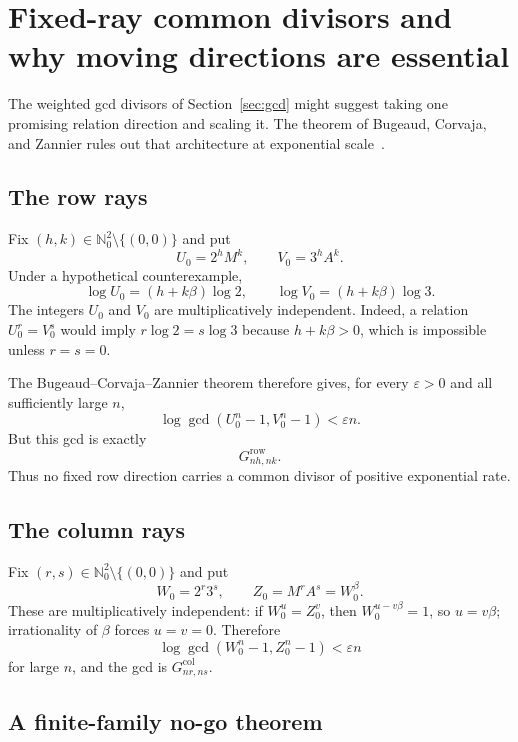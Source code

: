 \documentclass[11pt]{article}
\theoremstyle{definition}
\theoremstyle{remark}
\newcommand{\Nzero}{\mathbb N_0}
\begin{document}
\section{Fixed-ray common divisors and why moving directions are essential}
\label{sec:fixed-rays}

The weighted gcd divisors of Section~\ref{sec:gcd} might suggest taking one promising relation direction and scaling it.  The theorem of Bugeaud, Corvaja, and Zannier rules out that architecture at exponential scale~\cite{BCZ2003}.

\subsection{The row rays}

Fix $(h,k)\in\Nzero^2\setminus\{(0,0)\}$ and put
\[
 U_0=2^hM^k,
 \qquad V_0=3^hA^k.
\]
Under a hypothetical counterexample,
\[
 \log U_0=(h+k\beta)\log2,
 \qquad
 \log V_0=(h+k\beta)\log3.
\]
The integers $U_0$ and $V_0$ are multiplicatively independent.  Indeed, a relation $U_0^r=V_0^s$ would imply $r\log2=s\log3$ because $h+k\beta>0$, which is impossible unless $r=s=0$.

The Bugeaud--Corvaja--Zannier theorem therefore gives, for every $\varepsilon>0$ and all sufficiently large $n$,
\begin{equation}
 \log\gcd(U_0^n-1,V_0^n-1)<\varepsilon n.
 \label{eq:BCZ-row}
\end{equation}
But this gcd is exactly
\[
 G^{\mathrm{row}}_{nh,nk}.
\]
Thus no fixed row direction carries a common divisor of positive exponential rate.

\subsection{The column rays}

Fix $(r,s)\in\Nzero^2\setminus\{(0,0)\}$ and put
\[
 W_0=2^r3^s,
 \qquad Z_0=M^rA^s=W_0^\beta.
\]
These are multiplicatively independent: if $W_0^u=Z_0^v$, then
$W_0^{u-v\beta}=1$, so $u=v\beta$; irrationality of $\beta$ forces $u=v=0$.  Therefore
\begin{equation}
 \log\gcd(W_0^n-1,Z_0^n-1)<\varepsilon n
 \label{eq:BCZ-column}
\end{equation}
for large $n$, and the gcd is $G^{\mathrm{col}}_{nr,ns}$.

\subsection{A finite-family no-go theorem}
\end{document}

